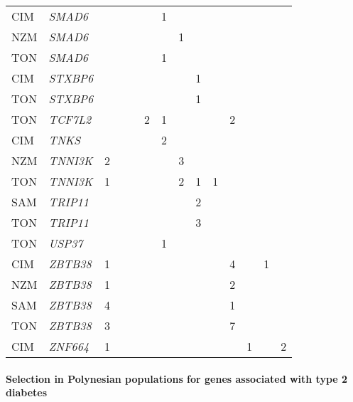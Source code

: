 \documentclass[]{report}
\let\oldparagraph\paragraph
\renewcommand{\paragraph}[1]{\oldparagraph{#1}\mbox{}}
\begin{document}
\begin{ThreePartTable}
\begin{longtable}[t]{llllllllllllll}
CIM & \em{SMAD6} &  &  &  &  & 1 &  &  &  &  &  &  & \\
NZM & \em{SMAD6} &  &  &  &  &  & 1 &  &  &  &  &  & \\
TON & \em{SMAD6} &  &  &  &  & 1 &  &  &  &  &  &  & \\
CIM & \em{STXBP6} &  &  &  &  &  &  & 1 &  &  &  &  & \\
TON & \em{STXBP6} &  &  &  &  &  &  & 1 &  &  &  &  & \\
TON & \em{TCF7L2} &  &  &  & 2 & 1 &  &  &  & 2 &  &  & \\
CIM & \em{TNKS} &  &  &  &  & 2 &  &  &  &  &  &  & \\
NZM & \em{TNNI3K} & 2 &  &  &  &  & 3 &  &  &  &  &  & \\
TON & \em{TNNI3K} & 1 &  &  &  &  & 2 & 1 & 1 &  &  &  & \\
SAM & \em{TRIP11} &  &  &  &  &  &  & 2 &  &  &  &  & \\
TON & \em{TRIP11} &  &  &  &  &  &  & 3 &  &  &  &  & \\
TON & \em{USP37} &  &  &  &  & 1 &  &  &  &  &  &  & \\
CIM & \em{ZBTB38} & 1 &  &  &  &  &  &  &  & 4 &  & 1 & \\
NZM & \em{ZBTB38} & 1 &  &  &  &  &  &  &  & 2 &  &  & \\
SAM & \em{ZBTB38} & 4 &  &  &  &  &  &  &  & 1 &  &  & \\
TON & \em{ZBTB38} & 3 &  &  &  &  &  &  &  & 7 &  &  & \\
CIM & \em{ZNF664} & 1 &  &  &  &  &  &  &  &  & 1 &  & 2\\*
\end{longtable}
\end{ThreePartTable}

\endgroup{}

\paragraph{Selection in Polynesian populations for genes associated with
type 2
diabetes}\label{selection-in-polynesian-populations-for-genes-associated-with-type-2-diabetes}
\end{document}
